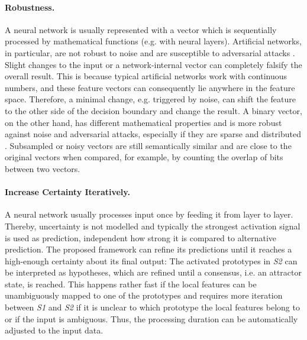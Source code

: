 \paragraph{Robustness.} A neural network is usually represented with a vector which is sequentially processed by mathematical functions (e.g. with neural layers). Artificial networks, in particular, are not robust to noise and are susceptible to adversarial attacks . Slight changes to the input or a network-internal vector can completely falsify the overall result. This is because typical artificial networks work with continuous numbers, and these feature vectors can consequently lie anywhere in the feature space. Therefore, a minimal change, e.g. triggered by noise, can shift the feature to the other side of the decision boundary and change the result. A binary vector, on the other hand, has different mathematical properties and is more robust against noise and adversarial attacks, especially if they are sparse and distributed .
Subsampled or noisy vectors are still semantically similar and are close to the original vectors when compared, for example, by counting the overlap of bits between two vectors.

\paragraph{Increase Certainty Iteratively.} A neural network usually processes input once by feeding it from layer to layer. Thereby, uncertainty is not modelled and typically the strongest activation signal is used as prediction, independent how strong it is compared to alternative prediction.
The proposed framework can refine its predictions until it reaches a high-enough certainty about its final output: The activated prototypes in \emph{S2} can be interpreted as hypotheses, which are refined until a consensus, i.e. an attractor state, is reached. This happens rather fast if the local features can be unambiguously mapped to one of the prototypes and requires more iteration between \emph{S1} and \emph{S2} if it is unclear to which prototype the local features belong to or if the input is ambiguous. Thus, the processing duration can be automatically adjusted to the input data.

